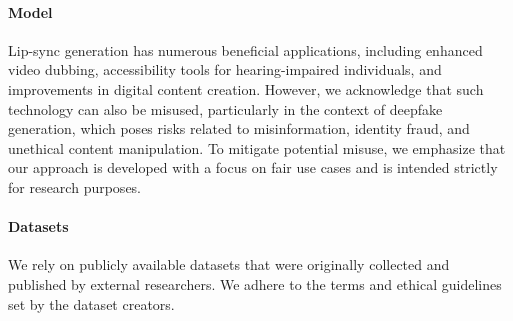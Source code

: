 \paragraph{Model}
Lip-sync generation has numerous beneficial applications, including enhanced video dubbing, accessibility tools for hearing-impaired individuals, and improvements in digital content creation. However, we acknowledge that such technology can also be misused, particularly in the context of deepfake generation, which poses risks related to misinformation, identity fraud, and unethical content manipulation. To mitigate potential misuse, we emphasize that our approach is developed with a focus on fair use cases and is intended strictly for research purposes. 

\paragraph{Datasets}
We rely on publicly available datasets that were originally collected and published by external researchers. We adhere to the terms and ethical guidelines set by the dataset creators. 
